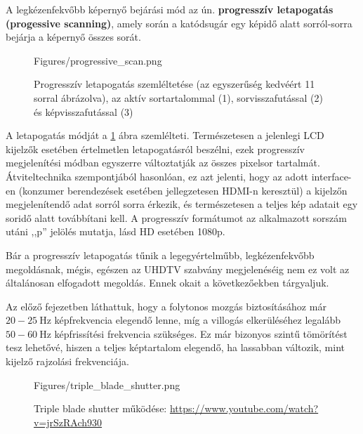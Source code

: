 \vspace{3mm}
A legkézenfekvőbb képernyő bejárási mód az ún. \textbf{progresszív letapogatás (progessive scanning)}, amely során a katódsugár egy képidő alatt sorról-sorra bejárja a képernyő összes sorát.
\begin{figure}[]
	\centering
	\begin{minipage}[c]{0.6\textwidth}
	\begin{overpic}[width = 1\columnwidth ]{Figures/progressive_scan.png}
	\end{overpic}   \end{minipage}\hfill
		\begin{minipage}[c]{0.3\textwidth}
	\caption{Progresszív letapogatás szemléltetése (az egyszerűség kedvéért 11 sorral ábrázolva), az aktív sortartalommal (1), sorvisszafutással (2) és képvisszafutással (3)}
	\label{Fig:progressive}  \end{minipage}
\end{figure}
A letapogatás módját a \ref{Fig:progressive} ábra szemlélteti.
Természetesen a jelenlegi LCD kijelzők esetében értelmetlen letapogatásról beszélni, ezek progresszív megjelenítési módban egyszerre változtatják az összes pixelsor tartalmát.
Átviteltechnika szempontjából hasonlóan, ez azt jelenti, hogy az adott interface-en (konzumer berendezések esetében jellegzetesen HDMI-n keresztül) a kijelzőn megjelenítendő adat sorról sorra érkezik, és természetesen a teljes kép adatait egy soridő alatt továbbítani kell.
A progresszív formátumot az alkalmazott sorszám utáni ,,p'' jelölés mutatja, lásd HD esetében 1080p.

Bár a progresszív letapogatás tűnik a legegyértelműbb, legkézenfekvőbb megoldásnak, mégis, egészen az UHDTV szabvány megjelenéséig nem ez volt az általánosan elfogadott megoldás.
Ennek okait a következőekben tárgyaljuk.

\vspace{3mm}
Az előző fejezetben láthattuk, hogy a folytonos mozgás biztosításához már $20-25~\mathrm{Hz}$ képfrekvencia elegendő lenne, míg a villogás elkerüléséhez legalább $50-60~\mathrm{Hz}$ képfrissítési frekvencia szükséges.
Ez már bizonyos szintű tömörítést tesz lehetővé, hiszen a teljes képtartalom elegendő, ha lassabban változik, mint kijelző rajzolási frekvenciája.

\begin{figure}  
\small
  \begin{minipage}[c]{0.64\textwidth}
	\begin{overpic}[width = 1\columnwidth ]{Figures/triple_blade_shutter.png}
	\end{overpic}   \end{minipage}\hfill
	\begin{minipage}[c]{0.3\textwidth}
    \caption{Triple blade shutter működése: \url{https://www.youtube.com/watch?v=jrSzRAch930} }
\label{fig:triple_blade_shutter}  \end{minipage}
\end{figure}

